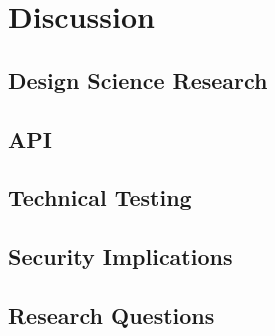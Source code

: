 \documentclass[../Main/thesis.tex]{subfiles}
\begin{document}
\chapter{Discussion}%
\label{ch:discussion}

\section{Design Science Research}%
\label{sec:design_science_research}

\section{API}%
\label{sec:api}

\section{Technical Testing}%
\label{sec:technical_testing}

\section{Security Implications}%
\label{sec:security_implications}

\section{Research Questions}%
\label{sec:research_questions}


\blankpage
\end{document}
